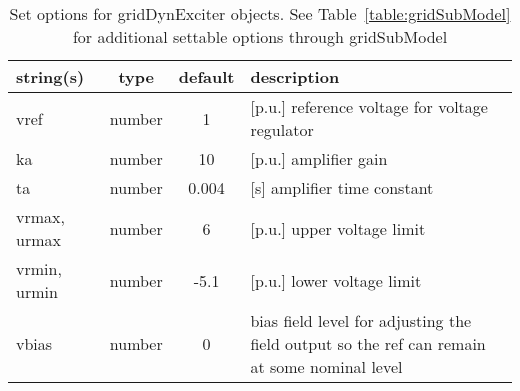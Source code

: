 \begin{table}[ht]
\centering
\begin{tabular}{p{5cm} c c p{7cm}}
\hline
string(s) & type & default & description \\
\hline
vref & number & 1 & [p.u.] reference voltage for voltage regulator\\
ka & number & 10 & [p.u.] amplifier gain\\
ta & number & 0.004 & [s]    amplifier time constant\\
vrmax, urmax & number & 6 & [p.u.] upper voltage limit\\
vrmin, urmin & number & -5.1 & [p.u.] lower voltage limit\\
vbias & number & 0 & bias field level for adjusting the field output so the ref can remain at some nominal level\\
\hline
\end{tabular}
\caption{Set options for gridDynExciter objects. See Table~\ref{table:gridSubModel} for additional settable options through gridSubModel}
\label{table:gridDynExciter}
\end{table}

